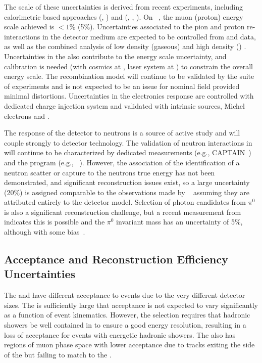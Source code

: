 The scale of these uncertainties is derived from recent experiments, including calorimetric based approaches (, ) and  (, , ). On ~\cite{NOvA:2018gge}, the muon (proton) energy scale achieved is $<1$\% (5\%). Uncertainties associated to the pion and proton re-interactions in the detector medium are expected to be controlled from  and  data, as well as the combined analysis of low density (gaseous) and high density () . Uncertainties in the \efield also contribute to the energy scale uncertainty, and calibration is needed (with cosmics at , laser system at ) to constrain the overall energy scale. The recombination model will continue to be validated by the suite of  experiments and is not expected to be an issue for nominal field provided minimal \efield distortions. Uncertainties in the electronics response are controlled with dedicated charge injection system and validated with intrinsic sources, Michel electrons and .

The response of the detector to neutrons is a source of active study and will couple strongly to detector technology. The validation of neutron interactions in  will continue to be characterized by dedicated measurements (e.g., CAPTAIN~\cite{Berns:2013usa,Bhandari:2019rat}) and the  program (e.g., ~\cite{Acciarri:2018myr}).  However, the association of the identification of a neutron scatter or capture to the neutrons true energy has not been demonstrated, and significant reconstruction issues exist, so a large uncertainty (20\%) is assigned comparable to the observations made by ~\cite{Elkins:2019vmy} assuming they are attributed entirely to the detector model. Selection of photon candidates from $\pi^0$ is also a significant reconstruction challenge, but a recent measurement from  indicates this is possible and the $\pi^0$ invariant mass has an uncertainty of 5\%, although with some bias~\cite{Adams:2018sgn}.

\subsection{Acceptance and Reconstruction Efficiency Uncertainties}

The  and  have different acceptance to  events due to the very different detector sizes. The  is sufficiently large that acceptance is not expected to vary significantly as a function of event kinematics. However, the  selection requires that hadronic showers be well contained in  to ensure a good energy resolution, resulting in a loss of acceptance for events with energetic hadronic showers. The  also has regions of muon phase space with lower acceptance due to tracks exiting the side of the  but failing to match to the .

